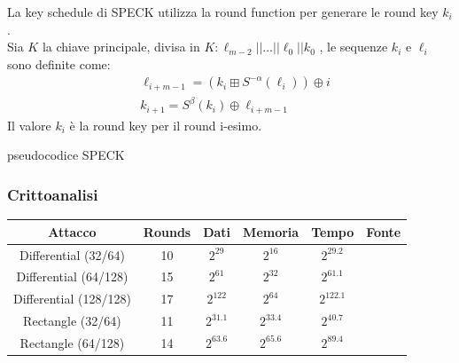\documentclass[target=bach,aauheader=,style=]{thud}
\begin{document}
			La key schedule di SPECK utilizza la round function per generare le round key $k_i$.\\
			Sia $K$ la chiave principale, divisa in $K : \ell_{m-2} ||...||\ell_0||k_0$ , le sequenze $k_i$ e $\ell_i$ sono definite come:
			\begin{align*}
				&\ell_{i+m-1} = (k_i \boxplus S^{-\alpha}(\ell_i)) \oplus i\\
				&k_{i+1} = S^{\beta}(k_i) \oplus \ell_{i+m-1}
			\end{align*}
			Il valore $k_i$ è la round key per il round i-esimo.
			\begin{algorithm}
				\caption{pseudocodice SPECK}
				\begin{algorithmic}
					\EndFor
					\EndFor
					\EndProcedure
				\end{algorithmic}
			\end{algorithm}
			
			\subsubsection{Crittoanalisi}
			\begin{center}
				\begin{tabular}{ |c|c|c|c|c|c| } 
					\hline
					Attacco & Rounds & Dati & Memoria & Tempo & Fonte \\ 
					\hline 
					\hline
					Differential (32/64) & 10 & $2^{29}$ & $2^{16}$ & $2^{29.2}$ & \cite{speckanal}\\
					\hline
					Differential (64/128) & 15 & $2^{61}$ & $2^{32}$ & $2^{61.1}$ & \cite{speckanal}\\
					\hline
					Differential (128/128) & 17 & $2^{122}$ & $2^{64}$ & $2^{122.1}$ & \cite{speckanal}\\
					\hline
					Rectangle (32/64) & 11 & $2^{31.1}$ & $2^{33.4}$ & $2^{40.7}$ & \cite{speckanal}\\
					\hline
					Rectangle (64/128) & 14 & $2^{63.6}$ & $2^{65.6}$ & $2^{89.4}$ & \cite{speckanal}\\
					\hline
				\end{tabular}
			\end{center}
\end{document}
